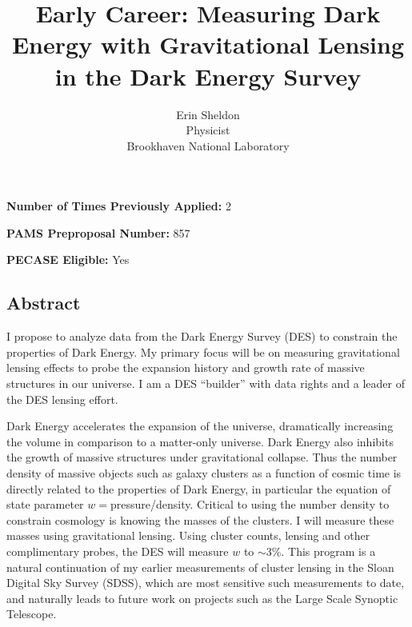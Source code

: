 \documentclass[12pt]{article}
\begin{document}
\vspace{3mm}
\noindent
{\bf Number of Times Previously Applied:} 2

\vspace{3mm}
\noindent
{\bf PAMS Preproposal Number:} 857


\vspace{3mm}
\noindent
{\bf PECASE Eligible:} Yes



\newpage

\tableofcontents

\newpage

\title{Early Career: Measuring Dark Energy with Gravitational Lensing in 
the Dark Energy Survey}
\author{Erin Sheldon\\
{\normalsize Physicist}\\
\normalsize{Brookhaven National Laboratory}}
\date{}
\maketitle



\begin{center}
\section*{Abstract}
\end{center}


I propose to analyze data from the Dark Energy Survey (DES) to constrain the
properties of Dark Energy.  My primary focus will be on measuring gravitational
lensing effects to probe the expansion history and growth rate of massive
structures in our universe.  I am a DES ``builder'' with data rights and a
leader of the DES lensing effort.

Dark Energy accelerates the expansion of the universe, dramatically increasing
the volume in comparison to a matter-only universe.  Dark Energy also inhibits
the growth of massive structures under gravitational collapse.  Thus the number
density of massive objects such as galaxy clusters as a function of cosmic time
is directly related to the properties of Dark Energy, in particular the
equation of state parameter $w=$pressure/density.  Critical to using the number
density to constrain cosmology is knowing the masses of the clusters. I will
measure these masses using gravitational lensing.  Using cluster counts,
lensing and other complimentary probes, the DES will measure $w$ to $\sim$3\%.
This program is a natural continuation of my earlier measurements of cluster
lensing in the Sloan Digital Sky Survey (SDSS), which are most sensitive such
measurements to date, and naturally leads to future work on projects such as
the Large Scale Synoptic Telescope\cite{lsstweb}.
\end{document}

